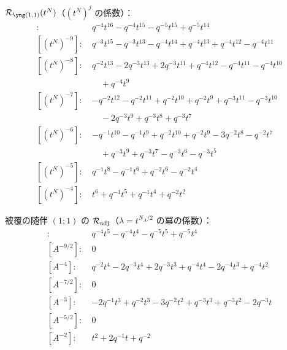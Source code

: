 $\Rred_{\yoneone}(t^N)$（$(t^N)^j$ の係数）：
\begin{align*}
[(t^N)^{-10}]\colon\ & q^{-4} t^{16} -q^{-4} t^{15} -q^{-5} t^{15} +q^{-5} t^{14} \\
[(t^N)^{-9}]\colon\ & q^{-3} t^{15} -q^{-3} t^{13} -q^{-4} t^{14} +q^{-4} t^{13} +q^{-4} t^{12} -q^{-4} t^{11} \\
[(t^N)^{-8}]\colon\ & q^{-2} t^{13} -2 q^{-3} t^{13} +2 q^{-3} t^{11} +q^{-4} t^{12} -q^{-4} t^{11} -q^{-4} t^{10} \\
& \quad +q^{-4} t^{9} \\
[(t^N)^{-7}]\colon\ & -q^{-2} t^{12} -q^{-2} t^{11} +q^{-2} t^{10} +q^{-2} t^{9} +q^{-3} t^{11} -q^{-3} t^{10} \\
& \quad -2 q^{-3} t^{9} +q^{-3} t^{8} +q^{-3} t^{7} \\
[(t^N)^{-6}]\colon\ & -q^{-1} t^{10} -q^{-1} t^{9} +q^{-2} t^{10} +q^{-2} t^{9} -3 q^{-2} t^{8} -q^{-2} t^{7} \\
& \quad +q^{-3} t^{9} +q^{-3} t^{7} -q^{-3} t^{6} -q^{-3} t^{5} \\
[(t^N)^{-5}]\colon\ & q^{-1} t^{8} -q^{-1} t^{6} +q^{-2} t^{6} -q^{-2} t^{4} \\
[(t^N)^{-4}]\colon\ & t^{6} +q^{-1} t^{5} +q^{-1} t^{4} +q^{-2} t^{2}
\end{align*}

被覆の随伴 $(1;1)$ の $\mathcal{R}_{\mathrm{adj}}$（$\lambda = t^{N_A/2}$ の冪の係数）：
\begin{align*}
[A^{-5}]\colon\ & q^{-4} t^{5} -q^{-4} t^{4} -q^{-5} t^{5} +q^{-5} t^{4} \\
[A^{-9/2}]\colon\ & 0 \\
[A^{-4}]\colon\ & q^{-2} t^{4} -2 q^{-3} t^{4} +2 q^{-3} t^{3} +q^{-4} t^{4} -2 q^{-4} t^{3} +q^{-4} t^{2} \\
[A^{-7/2}]\colon\ & 0 \\
[A^{-3}]\colon\ & -2 q^{-1} t^{3} +q^{-2} t^{3} -3 q^{-2} t^{2} +q^{-3} t^{3} +q^{-3} t^{2} -2 q^{-3} t \\
[A^{-5/2}]\colon\ & 0 \\
[A^{-2}]\colon\ & t^{2} +2 q^{-1} t +q^{-2}
\end{align*}
